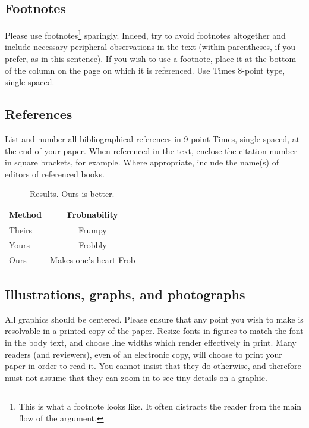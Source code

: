 \documentclass[10pt,twocolumn,letterpaper]{article}
\begin{document}
\subsection{Footnotes}

Please use footnotes\footnote {This is what a footnote looks like.  It
often distracts the reader from the main flow of the argument.} sparingly.
Indeed, try to avoid footnotes altogether and include necessary peripheral
observations in
the text (within parentheses, if you prefer, as in this sentence).  If you
wish to use a footnote, place it at the bottom of the column on the page on
which it is referenced. Use Times 8-point type, single-spaced.


\subsection{References}

List and number all bibliographical references in 9-point Times,
single-spaced, at the end of your paper. When referenced in the text,
enclose the citation number in square brackets, for
example.  Where appropriate, include the name(s) of
editors of referenced books.

\begin{table}
\begin{center}
\begin{tabular}{|l|c|}
\hline
Method & Frobnability \\
\hline\hline
Theirs & Frumpy \\
Yours & Frobbly \\
Ours & Makes one's heart Frob\\
\hline
\end{tabular}
\end{center}
\caption{Results.   Ours is better.}
\end{table}

\subsection{Illustrations, graphs, and photographs}

All graphics should be centered.  Please ensure that any point you wish to
make is resolvable in a printed copy of the paper.  Resize fonts in figures
to match the font in the body text, and choose line widths which render
effectively in print.  Many readers (and reviewers), even of an electronic
copy, will choose to print your paper in order to read it.  You cannot
insist that they do otherwise, and therefore must not assume that they can
zoom in to see tiny details on a graphic.
\end{document}
